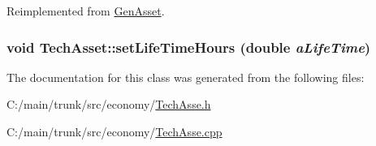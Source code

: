 Reimplemented from \hyperlink{class_gen_asset_a061638306e81bee77e8dfef34fe84a93}{GenAsset}.\hypertarget{class_tech_asset_ae6c2ae6c41c902723223012950f88467}{
\subsubsection[{setLifeTimeHours}]{\setlength{\rightskip}{0pt plus 5cm}void TechAsset::setLifeTimeHours (double {\em aLifeTime})}}
\label{class_tech_asset_ae6c2ae6c41c902723223012950f88467}


The documentation for this class was generated from the following files:\begin{DoxyCompactItemize}
\item 
C:/main/trunk/src/economy/\hyperlink{_tech_asse_8h}{TechAsse.h}\item 
C:/main/trunk/src/economy/\hyperlink{_tech_asse_8cpp}{TechAsse.cpp}\end{DoxyCompactItemize}
